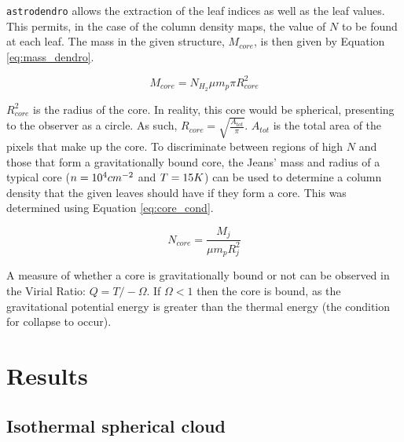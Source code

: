 \documentclass{report}
\begin{document}
\texttt{astrodendro} allows the extraction of the leaf indices as well as the leaf values. This permits, in the case of the column density maps, the value of $N$ to be found at each leaf. The mass in the given structure, $M_{core}$, is then given by Equation \ref{eq:mass_dendro}.

\begin{equation}
  M_{core} = N_{H_{2}}\mu m_{p} \pi R_{core}^{2}
  \label{eq:mass_dendro}
\end{equation}

$R_{core}^{2}$ is the radius of the core. In reality, this core would be spherical, presenting to the observer as a circle. As such, $R_{core} = \sqrt{\frac{A_{tot}}{\pi}}$. $A_{tot}$ is the total area of the pixels that make up the core. To discriminate between regions of high $N$ and those that form a gravitationally bound core, the Jeans' mass and radius of a typical core ($n = 10^{4}\/cm^{-2}$ and $T=15\/K$) can be used to determine a column density that the given leaves should have if they form a core. This was determined using Equation \ref{eq:core_cond}.

\begin{equation}
  N_{core} = \frac{M_{j}}{\mu m_{p} R_{j}^{2}}
   \label{eq:core_cond}
\end{equation}

A measure of whether a core is gravitationally bound or not can be observed in the Virial Ratio: $Q = T/-\Omega$. If $\Omega < 1$ then the core is bound, as the gravitational potential energy is greater than the thermal energy (the condition for collapse to occur).


\chapter{Results}

\section{Isothermal spherical cloud} \label{sec:iso}
\end{document}
